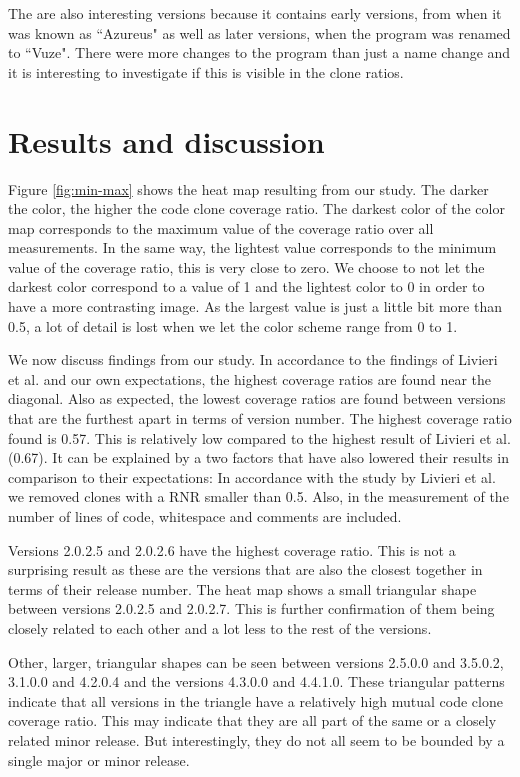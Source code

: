 \documentclass[a4paper,twoside, twocolumn, 11pt]{article}
\numberwithin{equation}{section}
\begin{document}
The are also interesting versions because it contains early versions, from when it was known as ``Azureus" as well as later versions, when the program was renamed to ``Vuze".
There were more changes to the program than just a name change %
and it is interesting to investigate if this is visible in the clone ratios.

\section{Results and discussion}
Figure \ref{fig:min-max} shows the heat map resulting from our study. 
The darker the color, the higher the code clone coverage ratio. 
The darkest color of the color map corresponds to the maximum value of the coverage ratio over all measurements.
In the same way, the lightest value corresponds to the minimum value of the coverage ratio, this is very close to zero. 
We choose to not let the darkest color correspond to a value of 1 and the lightest color to 0 in order to have a more contrasting image.
As the largest value is just a little bit more than 0.5, a lot of detail is lost when we let the color scheme range from 0 to 1.

We now discuss findings from our study.
In accordance to the findings of Livieri et al. and our own expectations, the highest coverage ratios are found near the diagonal.
Also as expected, the lowest coverage ratios are found between versions that are the furthest apart in terms of version number.
The highest coverage ratio found is 0.57. This is relatively low compared to the highest result of Livieri et al. (0.67).
It can be explained by a two factors that have also lowered their results in comparison to their expectations:
In accordance with the study by Livieri et al. we removed clones with a RNR smaller than 0.5. 
Also, in the measurement of the number of lines of code, whitespace and comments are included.

Versions 2.0.2.5 and 2.0.2.6 have the highest coverage ratio.
This is not a surprising result as these are the versions that are also the closest together in terms of their release number. 
The heat map shows a small triangular shape between versions 2.0.2.5 and 2.0.2.7. 
This is further confirmation of them being closely related to each other and a lot less to the rest of the versions.

Other, larger, triangular shapes can be seen between versions 2.5.0.0 and 3.5.0.2, 3.1.0.0 and 4.2.0.4 and the versions 4.3.0.0 and 4.4.1.0.
These triangular patterns indicate that all versions in the triangle have a relatively high mutual code clone coverage ratio.
This may indicate that they are all part of the same or a closely related minor release.
But interestingly, they do not all seem to be bounded by a single major or minor release.
\end{document}
